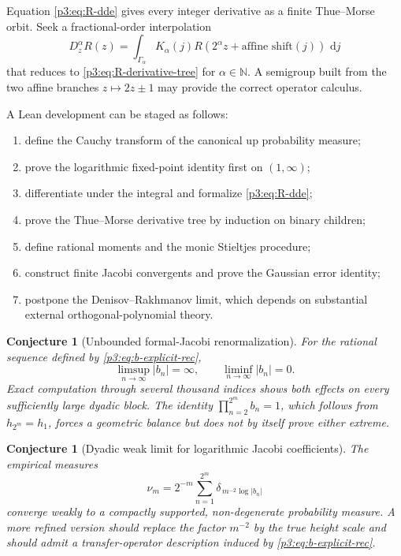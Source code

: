 \documentclass[11pt,oneside]{article}
\newtheorem{conjecture}[theorem]{Conjecture}
\theoremstyle{definition}
\newcommand{\dd}{\,\mathrm d}
\newcommand{\N}{\mathbb N}
\begin{document}
\begin{problem}
Equation \eqref{p3:eq:R-dde} gives every integer derivative as a finite Thue--Morse orbit.
Seek a fractional-order interpolation
\[
 D_z^{\alpha}R(z)=\int_{\Gamma_\alpha}K_\alpha(j)
 R(2^\alpha z+\text{affine shift}(j))\,\dd j
\]
that reduces to \eqref{p3:eq:R-derivative-tree} for \(\alpha\in\N\).  A semigroup built from
the two affine branches \(z\mapsto2z\pm1\) may provide the correct operator calculus.
\end{problem}

\begin{problem}
A Lean development can be staged as follows:
\begin{enumerate}
\item define the Cauchy transform of the canonical up probability measure;
\item prove the logarithmic fixed-point identity first on \((1,\infty)\);
\item differentiate under the integral and formalize \eqref{p3:eq:R-dde};
\item prove the Thue--Morse derivative tree by induction on binary children;
\item define rational moments and the monic Stieltjes procedure;
\item construct finite Jacobi convergents and prove the Gaussian error identity;
\item postpone the Denisov--Rakhmanov limit, which depends on substantial external
      orthogonal-polynomial theory.
\end{enumerate}
\end{problem}



\begin{conjecture}[Unbounded formal-Jacobi renormalization]
\label{p3:conj:formal-b-unbounded}
For the rational sequence defined by \eqref{p3:eq:b-explicit-rec},
\[
 \limsup_{n\to\infty}|b_n|=\infty,
 \qquad
 \liminf_{n\to\infty}|b_n|=0.
\]
Exact computation through several thousand indices shows both effects on every sufficiently
large dyadic block.  The identity \(\prod_{n=2}^{2^m}b_n=1\), which follows from
\(h_{2^m}=h_1\), forces a geometric balance but does not by itself prove either extreme.
\end{conjecture}

\begin{conjecture}[Dyadic weak limit for logarithmic Jacobi coefficients]
\label{p3:conj:b-log-limit}
The empirical measures
\[
 \nu_m=2^{-m}\sum_{n=1}^{2^m}
 \delta_{\,m^{-2}\log|b_n|}
\]
converge weakly to a compactly supported, non-degenerate probability measure.  A more
refined version should replace the factor \(m^{-2}\) by the true height scale and should
admit a transfer-operator description induced by \eqref{p3:eq:b-explicit-rec}.
\end{conjecture}
\end{document}
